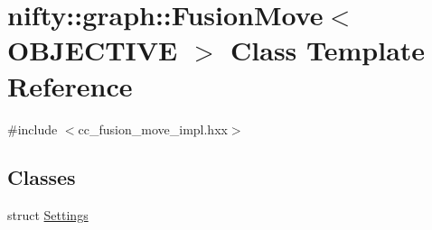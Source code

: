 \hypertarget{classnifty_1_1graph_1_1FusionMove}{}\section{nifty\+:\+:graph\+:\+:Fusion\+Move$<$ O\+B\+J\+E\+C\+T\+I\+V\+E $>$ Class Template Reference}
\label{classnifty_1_1graph_1_1FusionMove}


{\ttfamily \#include $<$cc\+\_\+fusion\+\_\+move\+\_\+impl.\+hxx$>$}

\subsection*{Classes}
\begin{DoxyCompactItemize}
\item 
struct \hyperlink{structnifty_1_1graph_1_1FusionMove_1_1Settings}{Settings}
\end{DoxyCompactItemize}
